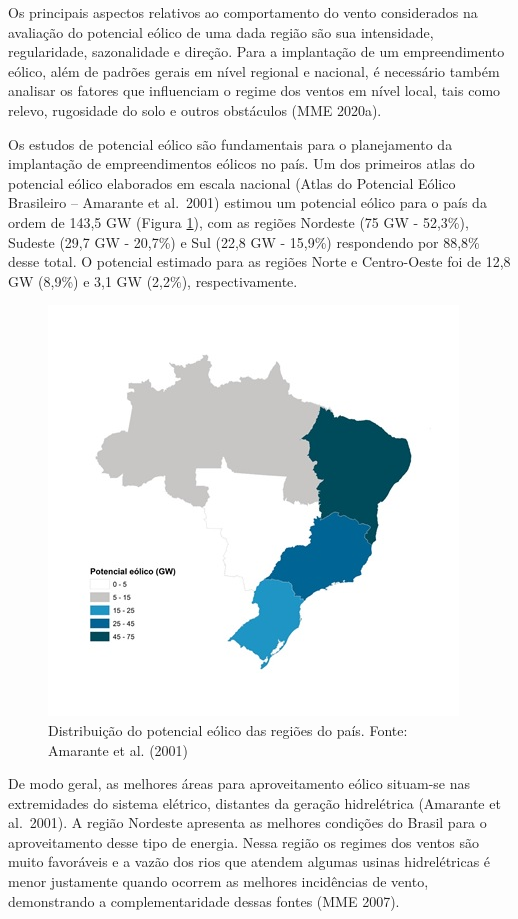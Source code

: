 \documentclass[
  oneside]{scrbook}
\begin{document}
Os principais aspectos relativos ao comportamento do vento considerados na avaliação do potencial eólico de uma dada região são sua intensidade, regularidade, sazonalidade e direção. Para a implantação de um empreendimento eólico, além de padrões gerais em nível regional e nacional, é necessário também analisar os fatores que influenciam o regime dos ventos em nível local, tais como relevo, rugosidade do solo e outros obstáculos (MME 2020a).

Os estudos de potencial eólico são fundamentais para o planejamento da implantação de empreendimentos eólicos no país. Um dos primeiros atlas do potencial eólico elaborados em escala nacional (Atlas do Potencial Eólico Brasileiro -- Amarante et al.~2001) estimou um potencial eólico para o país da ordem de 143,5 GW (Figura \ref{fig:02}), com as regiões Nordeste (75 GW - 52,3\%), Sudeste (29,7 GW - 20,7\%) e Sul (22,8 GW - 15,9\%) respondendo por 88,8\% desse total. O potencial estimado para as regiões Norte e Centro-Oeste foi de 12,8 GW (8,9\%) e 3,1 GW (2,2\%), respectivamente.

\begin{figure}[H]

{\centering \includegraphics[width=0.7\linewidth]{imagens/cap01/Figura_1.2} 

}

\caption{Distribuição do potencial eólico das regiões do país. Fonte: Amarante et al. (2001)}\label{fig:02}
\end{figure}

De modo geral, as melhores áreas para aproveitamento eólico situam-se nas extremidades do sistema elétrico, distantes da geração hidrelétrica (Amarante et al.~2001). A região Nordeste apresenta as melhores condições do Brasil para o aproveitamento desse tipo de energia. Nessa região os regimes dos ventos são muito favoráveis e a vazão dos rios que atendem algumas usinas hidrelétricas é menor justamente quando ocorrem as melhores incidências de vento, demonstrando a complementaridade dessas fontes (MME 2007).
\end{document}
